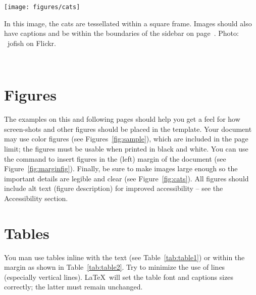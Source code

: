 
\begin{marginfigure}[-35pc]
  \begin{minipage}{\marginparwidth}
    \centering
    \texttt{[image: figures/cats]}
    \caption{In this image, the cats are tessellated within a square
      frame. Images should also have captions and be within the
      boundaries of the sidebar on page~\pageref{sec:sidebar}. Photo:
      \cczero~jofish on Flickr.}~\label{fig:marginfig}
  \end{minipage}
\end{marginfigure}

\section{Figures}
The examples on this and following pages should help you get a feel
for how screen-shots and other figures should be placed in the
template. Your document may use color figures (see
Figures~\ref{fig:sample}), which are included in the page limit; the
figures must be usable when printed in black and white. You can use
the \texttt{\marginpar} command to insert figures in the (left) margin
of the document (see Figure~\ref{fig:marginfig}). Finally, be sure to
make images large enough so the important details are legible and
clear (see Figure~\ref{fig:cats}).
All figures should include alt text (figure description) for improved accessibility – see the Accessibility section.

\section{Tables}
You man use tables inline with the text (see Table~\ref{tab:table1})
or within the margin as shown in Table~\ref{tab:table2}. Try to
minimize the use of lines (especially vertical lines). \LaTeX\ will
set the table font and captions sizes correctly; the latter must
remain unchanged.

